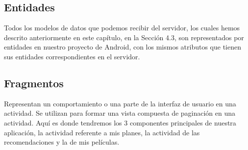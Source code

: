 \subsection{Entidades}
\label{makereference4.4.4}
Todos los modelos de datos que podemos recibir del servidor, los cuales hemos descrito anteriormente en este capítulo, en la Sección 4.3, son representados por entidades en nuestro proyecto de Android, con los mismos atributos que tienen sus entidades correspondientes en el servidor.

\subsection{Fragmentos}
\label{makereference4.4.5}
Representan un comportamiento o una parte de la interfaz de usuario en una actividad.
Se utilizan para formar una vista compuesta de paginación en una actividad. 
Aquí es donde tendremos los 3 componentes principales de nuestra aplicación, la actividad referente a mis planes, la actividad de las recomendaciones y la de mis películas.

